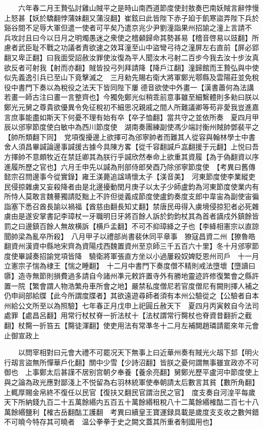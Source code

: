 　　六年春二月王贄弘討雞山賊平之是時山南西道節度使封敖奏巴南妖賊言辭悖慢上怒甚【妖於驕翻悖蒲妹翻又蒲沒翻】崔鉉曰此皆陛下赤子廹于飢寒盜弄陛下兵於谿谷間不足辱大軍但遣一使者可平矣乃遣京兆少尹劉潼詣果州招諭之潼上言請不兵攻討且曰今以日月之明燭愚迷之衆使之稽顙歸命其勢甚易【稽音啓易以豉翻】所慮者武臣耻不戰之功議者責欲速之效耳潼至山中盜彎弓待之潼屏左右直前【屏必郢翻又卑正翻】曰我面受詔赦汝罪使汝復為平人聞汝木弓射二百步今我去汝十步汝真欲反者可射我【射而亦翻】賊皆投弓列拜請降【降戶江翻】潼歸館而王贄弘與中使似先義逸引兵已至山下竟擊滅之　三月勑先賜右衛大將軍鄭光鄠縣及雲陽莊並免稅役中書門下奏以為稅役之法天下皆同陛下屢德音欲使中外畫一【漢書蕭何為法講若畫一師古注曰畫一言整齊也】今獨免鄭光似稍乖前意事雖至細繫體則多勑曰朕以鄭光元舅之尊貴欲優異令免征稅初不細思况親戚之間人所難議卿等苟非愛我豈進嘉言庶事能盡如斯天下何憂不理有始有卒【卒子恤翻】當共守之並依所奏　夏四月甲辰以邠寧節度使白敏中為西川節度使　湖南奏團練副使馮少端討衡州賊帥鄧裴平之【帥所類翻下同】　党項復擾邊上欲擇可為邠寧帥者而難其人從容與翰林學士中書舍人須昌畢諴論邊事諴援古據今具陳方畧【從千容翻諴戶嵓翻援于元翻】上悦曰吾方擇帥不意頗牧近在禁廷卿其為朕行乎諴欣然奉命上欲重其資履【為于偽翻資以序進履所歷之官也】六月壬申先以諴為刑部侍郎癸酉乃除邠寧節度使　【考異曰舊傳懿宗召問邊事今從實錄】雍王渼薨追諡靖懷太子【渼音美】　河東節度使李業縱吏民侵掠雜虜又妄殺降者由是北邊擾動閏月庚子以太子少師盧鈞為河東節度使業内有所恃人莫敢言魏謩獨請貶黜上不許但徙義成節度使盧鈞奏度支郎中韋宙為副使宙徧詣塞下悉召酋長諭以禍福【酋慈由翻長知丈翻】禁唐民毋得入虜境侵掠犯者必死雜虜由是遂安掌書記李璋杖一牙職明日牙將百餘人訴於鈞鈞杖其為首者謫戍外鎮餘皆罰之曰邊鎮百餘人無故横訴【横戶孟翻】不可不抑璋絳之子也【李絳相憲宗以直諒聞帥梁為亂卒所殺】　八月甲子以禮部尚書裴休同平章事　獠寇昌資二州【獠魯皓翻資州漢資中縣地宋齊為資陽戍西魏置資州至京師三千五百六十里】冬十月邠寧節度使畢諴奏招諭党項皆降　驍衛將軍張直方坐以小過屢殺奴婢貶恩州司戶　十一月立憲宗子惴為棣王【惴之睡翻】　十二月中書門下奏度僧不精則戒法墮壞【墮讀曰隳】造寺無節則損費過多請自今諸州凖元敕許置寺外有勝地靈迹許修復繁會之縣許置一院【繁會謂人物浩繁舟車所會之地】嚴禁私度僧尼若官度僧尼有闕則擇人補之仍申祠部給牒【此今所謂度牒者】其欲遠遊尋師者須有本州公驗從之【公驗者自本州給公文所至以為照驗】七年春正月戊申上祀圓丘赦天下　夏四月丙寅敕自今法司處罪【處昌呂翻】用常行杖杖脊一折法杖十【法杖謂常行臋杖也脊資昔翻折之截翻】杖臋一折笞五【臋徒渾翻】使吏用法有常凖冬十二月左補闕趙璘請罷來年元會止御宣政上

　　以問宰相對曰元會大禮不可罷况天下無事上曰近華州奏有賊光火刼下邽【明火行刼言盜無所憚華戶化翻】關中少雪【少詩沼翻】皆朕之憂何謂無事雖宣政亦不可御也　上事鄭太后甚謹不居别宫朝夕奉養【養余亮翻】舅鄭光歷平盧河中節度使上與之論為政光應對鄙淺上不悦留為右羽林統軍使奉朝請太后數言其貧【數所角翻】上輒厚賜金帛終不復任以民官【復扶又翻民官謂治民之官】　度支奏自河湟平每歲天下所納錢九百二十五萬餘緡内五百五十萬餘緡租稅八十二萬餘緡榷酤二百七十八萬餘緡鹽利【榷古岳翻酤工護翻　考異曰續皇王寶運録具載是歲度支支收之數舛錯不可曉今特存其可曉者　温公拳拳于史之闕文蓋其所重者制國用也】

